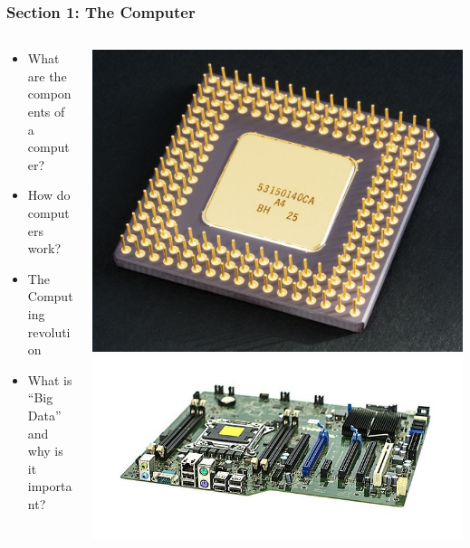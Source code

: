 \documentclass{beamer}
\begin{document}
\begin{frame}
    \frametitle{Section 1: The Computer}
    \begin{columns}
        \begin{column}{0.45\linewidth}
            \begin{itemize}
                \item What are the components of a computer?
                \item How do computers work?
                \item The Computing revolution
                \item What is ``Big Data'' and why is it important?
            \end{itemize}
        \end{column}
        \begin{column}{0.45\linewidth}
            \centering
            \includegraphics[width=0.5\linewidth]{cpu.jpg}
            \includegraphics[width=\linewidth]{motherboard.jpg}
        \end{column}
    \end{columns}
\end{frame}
\end{document}
